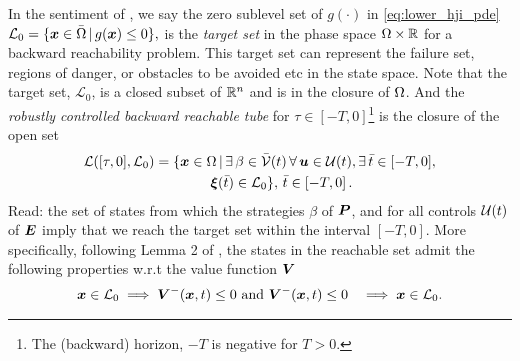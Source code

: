 In the sentiment of \cite{Mitchell2005}, we say the zero sublevel set of $g(\cdot)$ in \eqref{eq:lower_hji_pde} \ie $\mathcal{L}_0 = \{ \bm{x} \in \bar{\Omega} \,|\, g(\bm{x}) \le 0 \},$
%
%
is the \textit{target set} in the phase space $\Omega \times \mathbb{R}$ for a backward reachability problem. This target set can represent the failure set, regions of danger, or obstacles to be avoided etc in the state space. Note that the target set, $\mathcal{L}_0$, is a closed subset of $\mathbb{R}^n$ and is in the closure of $\Omega$. And the \textit{robustly controlled backward reachable tube} for $\tau \in [-T, 0]$\footnote{The (backward) horizon, $-T$ is negative for $T>0$.} is the closure of the open set
%
\begin{align}
	\mathcal{L}([\tau, 0], \mathcal{L}_0) &= \{\state \in \openset \,| \, \exists \, \beta \in \mathcal{\bar{V}}(t) \,  \forall \, \bm{u} \in \mathcal{U}(t), \exists \, \bar{t} \in [-T, 0], \nonumber \\
	& \qquad  \qquad \bm{\xi}(\bar{t})%
	\in  \mathcal{L}_0 \}, \,\bar{t} \in \left[-T, 0\right].
	\label{eq:rcbrt}
\end{align}
%
Read: the set of states from which the strategies $\beta$ of $\bm{P}$, and for all controls $\mathcal{U}(t)$ of $\bm{E}$ imply that we reach the target set within the interval $[-T, 0]$.   More specifically, following Lemma 2 of \cite{Mitchell2005}, the states in the reachable set admit the following properties w.r.t the value function $\bm{V}$
%
	\begin{align}
		\bm{x} \in \mathcal{L}_0 &\implies \bm{V}^-(\bm{x}, t) \le 0 \text{ and }		\bm{V}^-(\bm{x}, t) \le 0 &\implies \bm{x} \in \mathcal{L}_0.
	\end{align}
%
